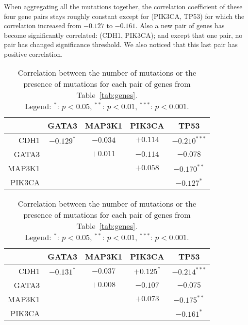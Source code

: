 \documentclass[letterpaper]{article}
\begin{document}
When aggregating all the mutations together, the correlation coefficient of these four gene pairs stays roughly constant except for (PIK3CA, TP53) for which the
correlation increased from $-0.127$ to $-0.161$. Also a new pair of genes has become significantly correlated: (CDH1, PIK3CA); and except that one pair,
no pair has changed significance threshold. We also noticed that this last pair has positive correlation.

\begin{table}[!h]
\begin{subtable}{.5\textwidth}
\begin{tabular}{r|c|c|c|c}
       & GATA3        & MAP3K1   & PIK3CA       & TP53           \\ \hline
CDH1   & $-0.129^{*}$ & $-0.034$ & $+0.114$     & $-0.210^{***}$ \\ \hline
GATA3  &              & $+0.011$ & $-0.114$     & $-0.078$       \\ \hline
MAP3K1 &              &          & $+0.058$     & $-0.170^{**}$  \\ \hline
PIK3CA &              &          &              & $-0.127^{*}$
\end{tabular}
\end{subtable}
\begin{subtable}{.5\textwidth}
\begin{tabular}{r|c|c|c|c}
       & GATA3        & MAP3K1   & PIK3CA       & TP53           \\ \hline
CDH1   & $-0.131^{*}$ & $-0.037$ & $+0.125^{*}$ & $-0.214^{***}$ \\ \hline
GATA3  &              & $+0.008$ & $-0.107$     & $-0.075$       \\ \hline
MAP3K1 &              &          & $+0.073$     & $-0.175^{**}$  \\ \hline
PIK3CA &              &          &              & $-0.161^{*}$
\end{tabular}
\end{subtable}
\caption{Correlation between the number of mutations or the presence of mutations for each pair of genes from Table~\ref{tab:genes}. \\
{\scriptsize Legend: $^{*}$: $p < 0.05$, $^{**}$: $p < 0.01$, $^{***}$: $p < 0.001$}.\label{tab:correlations}}
\end{table}
\end{document}
